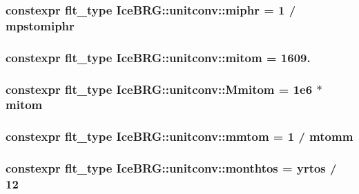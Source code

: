 \subsubsection[{miphr}]{\setlength{\rightskip}{0pt plus 5cm}constexpr {\bf flt\+\_\+type} Ice\+B\+R\+G\+::unitconv\+::miphr = 1 / {\bf mpstomiphr}}\label{namespaceIceBRG_1_1unitconv_af1314a212005ed6b7d3fa6d2451feb45}
\hypertarget{namespaceIceBRG_1_1unitconv_a7a6b1bd015eeebb8eaec3adb9599aa45}{}
\subsubsection[{mitom}]{\setlength{\rightskip}{0pt plus 5cm}constexpr {\bf flt\+\_\+type} Ice\+B\+R\+G\+::unitconv\+::mitom = 1609.}\label{namespaceIceBRG_1_1unitconv_a7a6b1bd015eeebb8eaec3adb9599aa45}
\hypertarget{namespaceIceBRG_1_1unitconv_af3e6184dd790741b009d5363f3f5fd42}{}
\subsubsection[{Mmitom}]{\setlength{\rightskip}{0pt plus 5cm}constexpr {\bf flt\+\_\+type} Ice\+B\+R\+G\+::unitconv\+::\+Mmitom = 1e6 $\ast$ mitom}\label{namespaceIceBRG_1_1unitconv_af3e6184dd790741b009d5363f3f5fd42}
\hypertarget{namespaceIceBRG_1_1unitconv_a48ae0a96fd539ae3e6d4af99faeb67aa}{}
\subsubsection[{mmtom}]{\setlength{\rightskip}{0pt plus 5cm}constexpr {\bf flt\+\_\+type} Ice\+B\+R\+G\+::unitconv\+::mmtom = 1 / {\bf mtomm}}\label{namespaceIceBRG_1_1unitconv_a48ae0a96fd539ae3e6d4af99faeb67aa}
\hypertarget{namespaceIceBRG_1_1unitconv_a2b85d8b5aae54ebff770fed659b7c672}{}
\subsubsection[{monthtos}]{\setlength{\rightskip}{0pt plus 5cm}constexpr {\bf flt\+\_\+type} Ice\+B\+R\+G\+::unitconv\+::monthtos = {\bf yrtos} / 12}\label{namespaceIceBRG_1_1unitconv_a2b85d8b5aae54ebff770fed659b7c672}
\hypertarget{namespaceIceBRG_1_1unitconv_ad4408e8c25b2d1f1cb17bae1eddb5de4}{}
